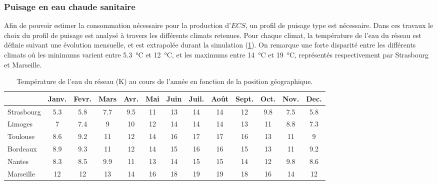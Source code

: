 \subsubsection{Puisage en eau chaude sanitaire} %
\label{ssub:puisage_en_eau_chaude_sanitaire}

Afin de pouvoir estimer la consommation nécessaire pour la production d’$ECS$, un profil
de puisage type est nécessaire. Dans ces travaux le choix du profil de puisage est analysé
à travers les différents climats retenues. Pour chaque climat, la température de l’eau du
réseau est définie suivant une évolution mensuelle, et est extrapolée durant la simulation
(\ref{tab:temp_eau}). On remarque une forte disparité entre les différents climats où les
minimums varient entre \SI{5.3}{\celsius} et
\SI{12}{\celsius}, et les maximums entre \SI{14}{\celsius} et \SI{19}{\celsius},
représentés respectivement par Strasbourg et Marseille.
\begin{table}
\centering
\caption{Température de l'eau du réseau (\si{\kelvin}) au cours de l'année en fonction de la
         position géographique.}
\label{tab:temp_eau}
\begin{tabular}{l*{12}{c}}
    \toprule
               & Janv. & Fevr. & Mars & Avr. & Mai & Juin & Juil. & Août & Sept. & Oct. & Nov. & Dec. \\
    \midrule
    Strasbourg & \num{5.3}   & \num{5.8}   & \num{7.7}  & \num{9.5}  & \num{11}  & \num{13}   & \num{14}    & \num{14}   & \num{12}    & \num{9.8}  & \num{7.5}  & \num{5.8}  \\
    Limoges    & \num{7}     & \num{7.4}   & \num{9}    & \num{10}   & \num{12}  & \num{14}   & \num{14}    & \num{14}   & \num{13}    & \num{11}   & \num{8.8}  & \num{7.3}  \\
    Toulouse   & \num{8.6}   & \num{9.2}   & \num{11}   & \num{12}   & \num{14}  & \num{16}   & \num{17}    & \num{17}   & \num{16}    & \num{13}   & \num{11}   & \num{9}    \\
    Bordeaux   & \num{8.9}   & \num{9.3}   & \num{11}   & \num{12}   & \num{14}  & \num{15}   & \num{16}    & \num{16}   & \num{15}    & \num{13}   & \num{11}   & \num{9.2}  \\
    Nantes     & \num{8.3}   & \num{8.5}   & \num{9.9}  & \num{11}   & \num{13}  & \num{14}   & \num{15}    & \num{15}   & \num{14}    & \num{12}   & \num{9.8}  & \num{8.6}  \\
    Marseille  & \num{12}    & \num{12}    & \num{13}   & \num{14}   & \num{16}  & \num{18}   & \num{19}    & \num{19}   & \num{18}    & \num{16}   & \num{14}   & \num{12}   \\
    \bottomrule
\end{tabular}
\end{table}


